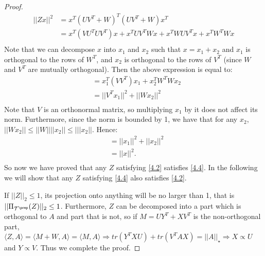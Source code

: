 \documentclass[11pt]{article}
\begin{document}
\begin{proof}
\begin{equation*}
\begin{aligned}
        ||Zx||^2 & = x^{T}(UV^{T}+W)^{T}(UV^{T}+W)x^{T} \\
                 & = x^{T}(VU^{T}UV^{T})x + x^{T}UV^{T}Wx + x^{T}WUV^{T}x + x^{T}W^{T}Wx \\
    \end{aligned}
\end{equation*}
Note that we can decompose $x$ into $x_1$ and $x_2$ such that $x = x_1+x_2$ and $x_1$ is orthogonal to the rows of $W^{T}$, and $x_2$ is orthogonal to the rows of $V^{T}$ (since $W$ and $V^{T}$ are mutually orthogonal). Then the above expression is equal to:
\begin{equation*}
    \begin{aligned}
        & = x_1^{T}(VV^{T})x_1 + x_2^{T}W^{T}Wx_2 \\
        & = ||V^{T}x_1||^2 + ||Wx_2||^2 \\
    \end{aligned}
\end{equation*}
Note that $V$ is an orthonormal matrix, so multiplying $x_1$ by it does not affect its norm. Furthermore, since the norm is bounded by 1, we have that for any $x_2$, $||Wx_2||\leq ||W||||x_2||\leq |||x_2||$. Hence:
\begin{equation*}
    \begin{aligned}
        & = ||x_1||^2 + ||x_2||^2 \\
        & = ||x||^2. \\
    \end{aligned}
\end{equation*}
So now we have proved that any $Z$ satisfying \eqref{4.2} satisfies \eqref{4.4}. In the following we will show that any $Z$ satisfying \eqref{4.4} also satisfies \eqref{4.2}.

\noindent If $||Z||_2\leq 1$, its projection onto anything will be no larger than 1, that is $||\Pi_{\mathcal{T}^{\prep}}(Z)||_2 \leq 1$. Furthermore, $Z$ can be decomposed into a part which is orthogonal to $A$ and part that is not, so if $M = UY^{T}+XV^{T}$ is the non-orthogonal part, $\langle Z,A \rangle = \langle M+W,A \rangle = \langle M,A \rangle \Rightarrow tr(Y^{T}XU)+tr(V^{T}AX) = ||A||_\star \Rightarrow X\propto U$ and $Y\propto V$. Thus we complete the proof.

\end{proof}
\end{document}
